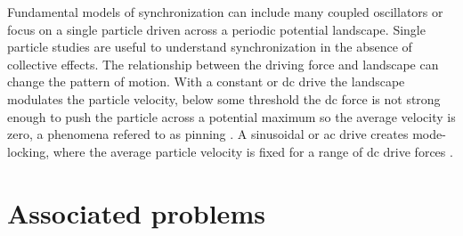 \documentclass[twocolumn,preprintnumbers,amsmath,amssymb,aps,prx]{revtex4}
\begin{document}
Fundamental models
of synchronization 
can include many coupled oscillators
or focus on 
a single particle driven across a periodic potential landscape.
Single particle studies 
are useful to understand synchronization
in the absence of collective effects.
The relationship between the driving force and
landscape can change the pattern of motion.  
With a constant or 
dc drive the landscape modulates 
the particle velocity, below some threshold  
the dc force is not strong enough to push the particle
across a potential maximum so the average velocity is zero,
a phenomena refered to as pinning \cite{Reichhardt2017}.  
A sinusoidal or ac drive creates mode-locking,
where the average particle velocity
is fixed for a range of dc drive forces \cite{Reichhardt2015}.


\section{Associated problems}
\label{sec:problems}	%
\end{document}
